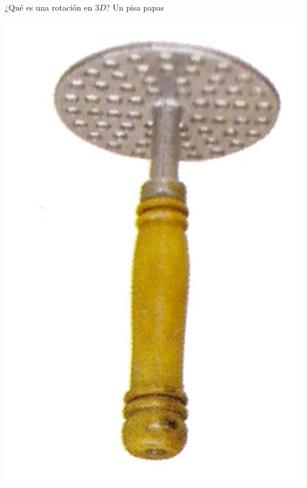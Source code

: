 \documentclass[10pt]{beamer}
\def\R{\mathbb{R}}
\begin{document}
\begin{frame}{¿Qué es una rotación en $3D$? Un pisa papas}




	\includegraphics[scale=0.2]{pisapapas_dadovuelta.png} \pause

\end{frame}
\end{document}

